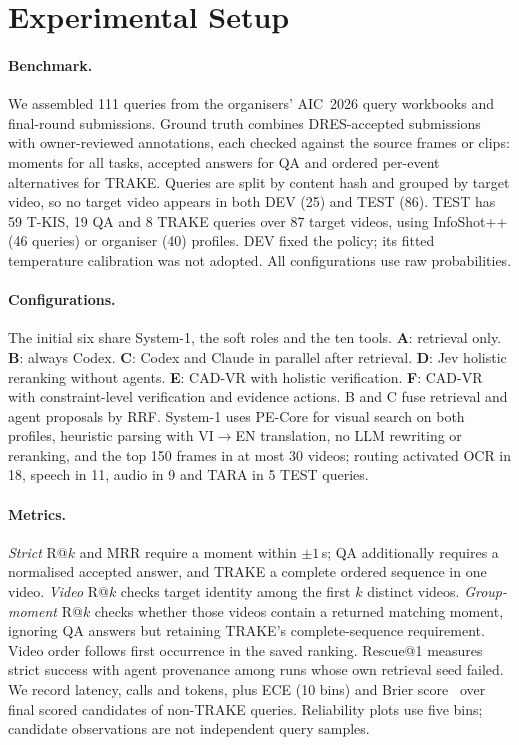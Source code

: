 \documentclass[runningheads]{llncs}
\begin{document}
\section{Experimental Setup}
\label{sec:setup}
\paragraph{Benchmark.} We assembled 111 queries from the organisers' AIC~2026 query workbooks and final-round submissions. Ground truth combines DRES-accepted submissions~\cite{dres2024} with owner-reviewed annotations, each checked against the source frames or clips: moments for all tasks, accepted answers for QA and ordered per-event alternatives for TRAKE. Queries are split by content hash and grouped by target video, so no target video appears in both DEV (25) and TEST (86). TEST has 59 T-KIS, 19 QA and 8 TRAKE queries over 87 target videos, using InfoShot++ (46 queries) or organiser (40) profiles. DEV fixed the policy; its fitted temperature calibration was not adopted. All configurations use raw probabilities.

\paragraph{Configurations.} The initial six share System-1, the soft roles and the ten tools. \textbf{A}: retrieval only. \textbf{B}: always Codex. \textbf{C}: Codex and Claude in parallel after retrieval. \textbf{D}: Jev holistic reranking without agents. \textbf{E}: CAD-VR with holistic verification. \textbf{F}: CAD-VR with constraint-level verification and evidence actions. B and C fuse retrieval and agent proposals by RRF. System-1 uses PE-Core for visual search on both profiles, heuristic parsing with VI$\to$EN translation, no LLM rewriting or reranking, and the top 150 frames in at most 30 videos; routing activated OCR in 18, speech in 11, audio in 9 and TARA in 5 TEST queries.

\paragraph{Metrics.} \emph{Strict} R@$k$ and MRR require a moment within $\pm1$\,s; QA additionally requires a normalised accepted answer, and TRAKE a complete ordered sequence in one video. \emph{Video} R@$k$ checks target identity among the first $k$ distinct videos. \emph{Group-moment} R@$k$ checks whether those videos contain a returned matching moment, ignoring QA answers but retaining TRAKE's complete-sequence requirement. Video order follows first occurrence in the saved ranking. Rescue@1 measures strict success with agent provenance among runs whose own retrieval seed failed. We record latency, calls and tokens, plus ECE (10 bins) and Brier score~\cite{brier1950} over final scored candidates of non-TRAKE queries. Reliability plots use five bins; candidate observations are not independent query samples.
\end{document}
